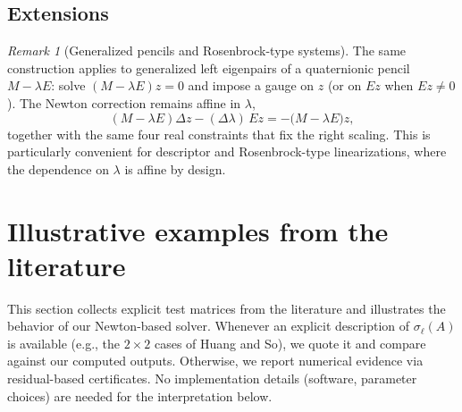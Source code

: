 \documentclass[preprint,12pt]{elsarticle}  %
\theoremstyle{definition}
\theoremstyle{definition}
\theoremstyle{definition}
\theoremstyle{definition}
\theoremstyle{definition}
\theoremstyle{remark}
\newtheorem{Rem}{Remark}
\theoremstyle{remark}
\theoremstyle{remark}
\begin{document}
\subsection{Extensions}
\label{subsec_newton_extensions}
\begin{Rem}[Generalized pencils and Rosenbrock-type systems]
\label{rem_pencil_extension}
The same construction applies to generalized left eigenpairs of a quaternionic pencil $M-\lambda E$:
solve $(M-\lambda E)z=0$ and impose a gauge on $z$ (or on $Ez$ when $Ez\neq 0$).
The Newton correction remains affine in $\lambda$,
\[
(M-\lambda E)\Delta z-(\Delta\lambda)\,Ez=-\bigl(M-\lambda E\bigr)z,
\]
together with the same four real constraints that fix the right scaling.
This is particularly convenient for descriptor and Rosenbrock-type linearizations, where the dependence on $\lambda$
is affine by design.
\end{Rem}


\section{Illustrative examples from the literature}
\label{sec:illustrative_literature_examples}
This section collects explicit test matrices from the literature and illustrates the behavior of our Newton-based solver.
Whenever an explicit description of $\sigma_\ell(A)$ is available (e.g., the $2\times2$ cases of Huang and So), we quote it and compare against our computed outputs. Otherwise, we report numerical evidence via residual-based certificates. No implementation details (software, parameter choices) are needed for the
interpretation below.

\end{document}
